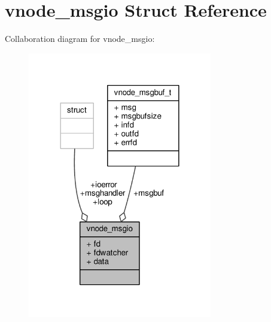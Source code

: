 \hypertarget{structvnode__msgio}{\section{vnode\+\_\+msgio Struct Reference}
\label{structvnode__msgio}
}


Collaboration diagram for vnode\+\_\+msgio\+:
\nopagebreak
\begin{figure}[H]
\begin{center}
\leavevmode
\includegraphics[width=228pt]{structvnode__msgio__coll__graph}
\end{center}
\end{figure}
